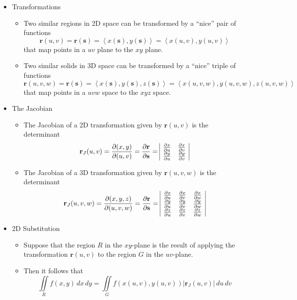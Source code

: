 \documentclass[12pt]{article}
\renewcommand{\vec}[1]{\mathbf{#1}}
\newcommand{\<}{\left<}
\renewcommand{\>}{\right>}
\newcommand{\p}{\partial}
\begin{document}
  \begin{itemize}
  
  \item Transformations
  
    \begin{itemize}
    \item Two similar regions in 2D space can be transformed by a ``nice'' pair of functions \[\vec{r}(u,v) = \vec{r}(\vec{s}) = \<x(\vec{s}),y(\vec{s})\> = \<x(u,v),y(u,v)\>\] that map points in a $uv$ plane to the $xy$ plane.
    \item Two similar solids in 3D space can be transformed by a ``nice'' triple of functions \[\vec{r}(u,v,w) = \vec{r}(\vec{s}) = \<x(\vec{s}),y(\vec{s}),z(\vec{s})\> = \<x(u,v,w),y(u,v,w),z(u,v,w)\>\] that map points in a $uvw$ space to the $xyz$ space.
    \end{itemize}
  
  \item The Jacobian
  
    \begin{itemize}
    \item The Jacobian of a 2D transformation given by $\vec{r}(u,v)$ is the determinant
\[
\vec{r}_J(u,v) = \frac{\p (x,y)}{\p (u,v)} = \frac{\p\vec{r}}{\p\vec{s}} =
\begin{array}{|c c|}
\frac{\partial x}{\partial u} & \frac{\partial x}{\partial v} \\
\frac{\partial y}{\partial u} & \frac{\partial y}{\partial v} \\
\end{array}
\]
    \item The Jacobian of a 3D transformation given by $\vec{r}(u,v,w)$ is the determinant
\[
\vec{r}_J(u,v,w) = \frac{\partial (x,y,z)}{\partial (u,v,w)} = \frac{\p\vec{r}}{\p\vec{s}} =
\begin{array}{|c c c|}
\frac{\partial x}{\partial u} & \frac{\partial x}{\partial v} & \frac{\partial x}{\partial w} \\
\frac{\partial y}{\partial u} & \frac{\partial y}{\partial v} & \frac{\partial y}{\partial w} \\
\frac{\partial z}{\partial u} & \frac{\partial z}{\partial v} & \frac{\partial z}{\partial w} \\
\end{array}
\]
    \end{itemize}
    
  \item 2D Substitution
  
    \begin{itemize}
    \item Suppose that the region $R$ in the $xy$-plane is the result of applying the transformation $\vec{r}(u,v)$ to the region $G$ in the $uv$-plane.
    \item Then it follows that \[\iint\limits_R f(x,y)\,dx\,dy = \iint\limits_G f(x(u,v),y(u,v))|\vec{r}_J(u,v)|\,du\,dv\]
    \end{itemize}


\end{itemize}
\end{document}
